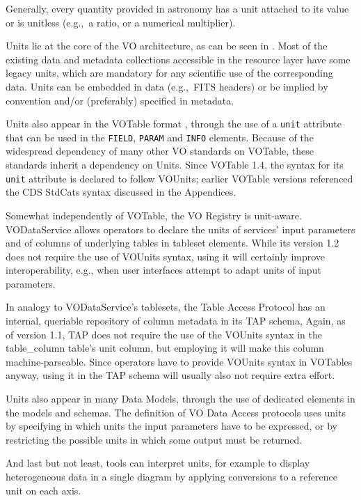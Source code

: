 \documentclass[11pt,a4paper]{ivoa}
\def\eg{e.g.,~}
\begin{document}
Generally, every quantity provided in astronomy has a unit attached to
its value or is unitless (\eg a ratio, or a numerical multiplier).  

Units lie at the core of the VO architecture, as can be seen in .
Most of the existing data and metadata collections accessible in the resource
layer have some legacy units, which are mandatory for any scientific use of
the corresponding data.  Units can be embedded in data (\eg FITS headers) or be
implied by convention and/or (preferably) specified in metadata.

Units also appear in the VOTable format \citep{2019ivoa.spec.1021O}, through the use
of a {\tt unit} attribute that can be used in the {\tt FIELD}, {\tt PARAM} and {\tt INFO} 
elements. Because of the widespread dependency of many other VO standards on VOTable,
these standards inherit a dependency on Units.
Since VOTable 1.4, the syntax for its {\tt unit} attribute is
declared to follow VOUnits; earlier VOTable versions
referenced the CDS StdCats syntax discussed in the Appendices.

Somewhat independently of VOTable, the VO Registry is unit-aware.
VODataService \citep{2021ivoa.spec.1102D} allows operators to declare
the units of services' input parameters and of columns of underlying
tables in tableset elements.  While its version 1.2 does not require the
use of VOUnits syntax, using it will certainly improve interoperability,
e.g., when user interfaces attempt to adapt units of input parameters.

In analogy to VODataService's tablesets, the Table Access Protocol
\citep{2019ivoa.spec.0927D} has an internal, queriable repository of
column metadata in its TAP schema, Again, as of version 1.1, TAP does
not require the use of the VOUnits syntax in the table\_column table's
unit column, but employing it will make this column machine-parseable.
Since operators have to provide VOUnits syntax in VOTables anyway, using
it in the TAP schema will usually also not require extra effort.

Units also appear in many Data Models, through the use of dedicated elements in
the models and schemas.
The definition of VO Data Access protocols uses units by specifying in which units the input
parameters have to be expressed, or by restricting the possible units in which some 
output must be returned.

And last but not least, tools can interpret units, for example to display
heterogeneous data in a single diagram by applying conversions to a reference 
unit on each axis.
\end{document}

